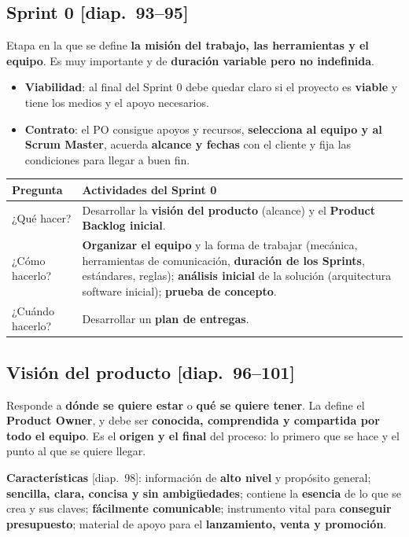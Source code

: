 \documentclass[11pt,a4paper,oneside,openany]{report}
\newcommand{\diap}[1]{\textcolor{mdaPrimary}{\small[diap.~#1]}}
\begin{document}
\subsection{Sprint 0 \diap{93--95}}
Etapa en la que se define \textbf{la misión del trabajo, las herramientas y el equipo}. Es muy importante y de
\textbf{duración variable pero no indefinida}.
\begin{itemize}[leftmargin=*]
  \item \textbf{Viabilidad}: al final del Sprint 0 debe quedar claro si el proyecto es \textbf{viable} y tiene los medios
        y el apoyo necesarios.
  \item \textbf{Contrato}: el PO consigue apoyos y recursos, \textbf{selecciona al equipo y al Scrum Master}, acuerda
        \textbf{alcance y fechas} con el cliente y fija las condiciones para llegar a buen fin.
\end{itemize}
\begin{center}\small
\begin{tabular}{lp{11cm}}
\toprule
\textbf{Pregunta} & \textbf{Actividades del Sprint 0} \\ \midrule
¿Qué hacer? & Desarrollar la \textbf{visión del producto} (alcance) y el \textbf{Product Backlog inicial}. \\
¿Cómo hacerlo? & \textbf{Organizar el equipo} y la forma de trabajar (mecánica, herramientas de comunicación, \textbf{duración de los Sprints}, estándares, reglas); \textbf{análisis inicial} de la solución (arquitectura software inicial); \textbf{prueba de concepto}. \\
¿Cuándo hacerlo? & Desarrollar un \textbf{plan de entregas}. \\
\bottomrule
\end{tabular}
\end{center}

\subsection{Visión del producto \diap{96--101}}
\begin{definicion}[Visión]
Responde a \textbf{dónde se quiere estar} o \textbf{qué se quiere tener}. La define el \textbf{Product Owner}, y debe ser
\textbf{conocida, comprendida y compartida por todo el equipo}. Es el \textbf{origen y el final} del proceso: lo primero
que se hace y el punto al que se quiere llegar.
\end{definicion}
\textbf{Características} \diap{98}: información de \textbf{alto nivel} y propósito general; \textbf{sencilla, clara,
concisa y sin ambigüedades}; contiene la \textbf{esencia} de lo que se crea y sus claves; \textbf{fácilmente
comunicable}; instrumento vital para \textbf{conseguir presupuesto}; material de apoyo para el \textbf{lanzamiento,
venta y promoción}.
\end{document}

